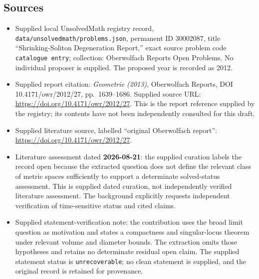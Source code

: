 \documentclass[11pt]{article}
\begin{document}
\subsection{Sources}
\begin{itemize}
\item Supplied local UnsolvedMath registry record, \texttt{data/unsolvedmath/problems.json}, permanent ID \(30002087\), title ``Shrinking-Soliton Degeneration Report,'' exact source problem code \texttt{catalogue entry}; collection: Oberwolfach Reports Open Problems. No individual proposer is supplied. The proposed year is recorded as 2012.
\item Supplied report citation: \emph{Geometrie (2013)}, Oberwolfach Reports, DOI 10.4171/owr/2012/27, pp.~1639--1686. Supplied source URL: \url{https://doi.org/10.4171/owr/2012/27}. This is the report reference supplied by the registry; its contents have not been independently consulted for this draft.
\item Supplied literature source, labelled ``original Oberwolfach report'': \url{https://doi.org/10.4171/owr/2012/27}.
\item Literature assessment dated \textbf{2026-08-21}: the supplied curation labels the record open because the extracted question does not define the relevant class of metric spaces sufficiently to support a determinate solved-status assessment. This is supplied dated curation, not independently verified literature assessment. The background explicitly requests independent verification of time-sensitive status and cited claims.
\item Supplied statement-verification note: the contribution uses the broad limit question as motivation and states a compactness and singular-locus theorem under relevant volume and diameter bounds. The extraction omits those hypotheses and retains no determinate residual open claim. The supplied statement status is \texttt{unrecoverable}; no clean statement is supplied, and the original record is retained for provenance.
\end{itemize}
\end{document}
